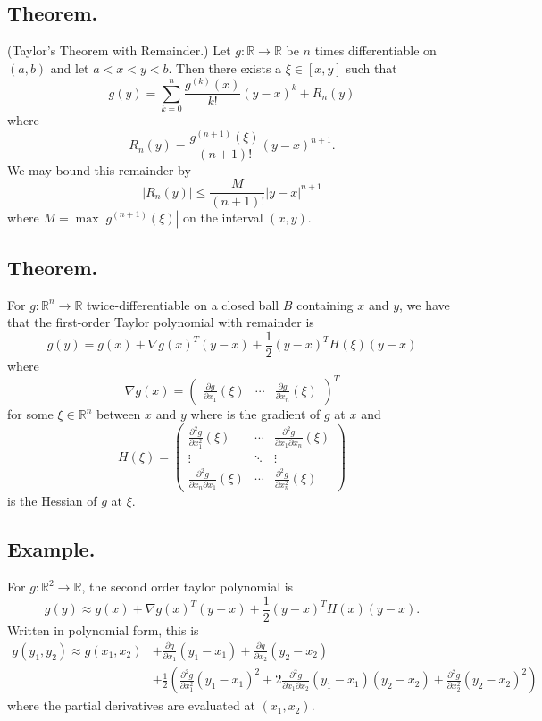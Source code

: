 \documentclass[titlepage]{article}
\begin{document}
\subsection{Theorem.} (Taylor's Theorem with Remainder.) 
Let $g: \mathbb{R} \to \mathbb{R}$ be $n$ times differentiable on $(a, b)$ and let $a < x < y < b$. Then there exists a $\xi \in [x, y]$ such that 
$$g(y) = \sum_{k=0}^{n}\frac{g^{(k)}(x)}{k!}(y-x)^{k} + R_{n}(y)$$
where
$$R_{n}(y) = \frac{g^{(n+1)}(\xi)}{(n+1)!}(y-x)^{n+1}.$$
We may bound this remainder by 
$$|R_{n}(y)| \leq \frac{M}{(n+1)!}|y-x|^{n+1}$$
where $M = \max|g^{(n+1)}(\xi)|$ on the interval $(x, y)$.

\subsection{Theorem.} For $g: \mathbb{R}^{n} \to \mathbb{R}$ twice-differentiable on a closed ball $B$ containing $x$ and $y$, we have that the first-order Taylor polynomial with remainder is 
$$g(y) = g(x) + \nabla g(x)^{T}(y-x) + \frac{1}{2}(y-x)^{T}H(\xi)(y-x)$$
where 
$$\nabla g(x) = \begin{pmatrix} \frac{\partial g}{\partial x_{1}}(\xi) & \cdots & \frac{\partial g}{\partial x_{n}}(\xi) \end{pmatrix}^{T}$$
for some $\xi \in \mathbb{R}^{n}$ between $x$ and $y$ where is the gradient of $g$ at $x$ and 
$$H(\xi) = \begin{pmatrix} \frac{\partial^{2} g}{\partial x_{1}^{2}}(\xi) & \cdots & \frac{\partial^{2} g}{\partial x_{1}\partial x_{n}}(\xi) \\ \vdots & \ddots & \vdots \\ \frac{\partial^{2} g}{\partial x_{n}\partial x_{1}}(\xi) & \cdots & \frac{\partial^{2} g}{\partial x_{n}^{2}}(\xi) \end{pmatrix}$$
is the Hessian of $g$ at $\xi$.

\subsection{Example.} For $g: \mathbb{R}^{2} \to \mathbb{R}$, the second order taylor polynomial is 
$$g(y) \approx g(x) + \nabla g(x)^{T}(y-x) + \frac{1}{2}(y-x)^{T}H(x)(y-x).$$
Written in polynomial form, this is 
\begin{align*}
    g(y_{1}, y_{2}) \approx g(x_{1}, x_{2}) &+ \frac{\partial g}{\partial x_{1}}(y_{1}-x_{1}) + \frac{\partial g}{\partial x_{2}}(y_{2}-x_{2}) \\
                                            &+ \frac{1}{2}\left(\frac{\partial^{2} g}{\partial x_{1}^{2}}(y_{1}-x_{1})^{2} + 2\frac{\partial^{2} g}{\partial x_{1}\partial x_{2}}(y_{1}-x_{1})(y_{2}-x_{2}) + \frac{\partial^{2} g}{\partial x_{2}^{2}}(y_{2}-x_{2})^{2}\right)
\end{align*}
where the partial derivatives are evaluated at $(x_{1}, x_{2})$.
\end{document}
